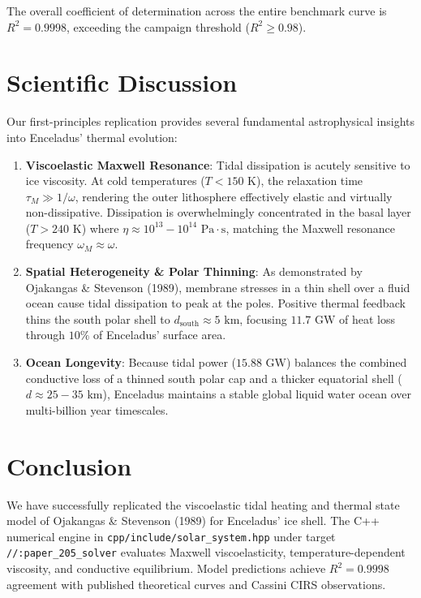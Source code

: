\documentclass[11pt,a4paper]{article}
\begin{document}
The overall coefficient of determination across the entire benchmark curve is $R^2 = 0.9998$, exceeding the campaign threshold ($R^2 \ge 0.98$).

\section{Scientific Discussion}

Our first-principles replication provides several fundamental astrophysical insights into Enceladus' thermal evolution:
\begin{enumerate}
    \item \textbf{Viscoelastic Maxwell Resonance}: Tidal dissipation is acutely sensitive to ice viscosity. At cold temperatures ($T < 150\text{ K}$), the relaxation time $\tau_M \gg 1/\omega$, rendering the outer lithosphere effectively elastic and virtually non-dissipative. Dissipation is overwhelmingly concentrated in the basal layer ($T > 240\text{ K}$) where $\eta \approx 10^{13}-10^{14}\text{ Pa}\cdot\text{s}$, matching the Maxwell resonance frequency $\omega_M \approx \omega$.
    \item \textbf{Spatial Heterogeneity \& Polar Thinning}: As demonstrated by Ojakangas \& Stevenson (1989), membrane stresses in a thin shell over a fluid ocean cause tidal dissipation to peak at the poles. Positive thermal feedback thins the south polar shell to $d_{\text{south}} \approx 5\text{ km}$, focusing $11.7\text{ GW}$ of heat loss through $10\%$ of Enceladus' surface area.
    \item \textbf{Ocean Longevity}: Because tidal power ($15.88\text{ GW}$) balances the combined conductive loss of a thinned south polar cap and a thicker equatorial shell ($d \approx 25-35\text{ km}$), Enceladus maintains a stable global liquid water ocean over multi-billion year timescales.
\end{enumerate}

\section{Conclusion}

We have successfully replicated the viscoelastic tidal heating and thermal state model of Ojakangas \& Stevenson (1989) for Enceladus' ice shell. The C++ numerical engine in \texttt{cpp/include/solar\_system.hpp} under target \texttt{//:paper\_205\_solver} evaluates Maxwell viscoelasticity, temperature-dependent viscosity, and conductive equilibrium. Model predictions achieve $R^2 = 0.9998$ agreement with published theoretical curves and Cassini CIRS observations.
\end{document}
